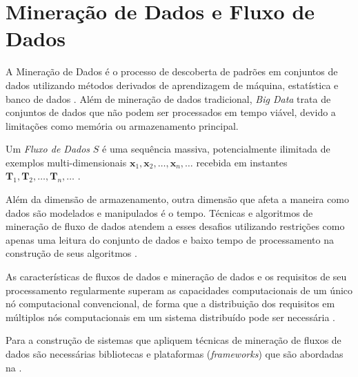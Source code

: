 \section{Mineração de Dados e Fluxo de Dados}

A Mineração de Dados é o processo de descoberta de padrões em conjuntos de dados
utilizando métodos derivados de aprendizagem de máquina, estatística e banco de
dados \cite{Gaber2005}.
Além de mineração de dados tradicional, \emph{Big Data} trata de
conjuntos de dados que não podem ser processados em tempo viável, devido a limitações
como memória ou armazenamento principal.

\begin{definition}
    Um \textit{Fluxo de Dados} $S$ é uma sequência massiva, potencialmente
    ilimitada de exemplos multi-dimensionais
    $\mathbf{x}_1, \mathbf{x}_2, \dots, \mathbf{x}_n, \dots$
    recebida em instantes
    $\mathbf{T}_1, \mathbf{T}_2, \dots, \mathbf{T}_n, \dots$
    \cite{Aggarwal2003}.
\end{definition}

Além da dimensão de armazenamento, outra dimensão que afeta a maneira como dados
são modelados e manipulados é o tempo.
Técnicas e algoritmos de mineração de fluxo de dados atendem a esses desafios utilizando
restrições como apenas uma leitura do conjunto de dados e baixo tempo de
processamento na construção de seus algoritmos \cite{Gama2007, Gaber2005}.

As características de fluxos de dados e mineração de dados e os requisitos de
seu processamento regularmente superam as capacidades computacionais de um único
nó computacional convencional, de forma que a distribuição dos requisitos em
múltiplos nós computacionais em um sistema distribuído pode ser necessária
\cite{Gaber2005}.


Para a construção de sistemas que apliquem técnicas de mineração de fluxos de
dados são necessárias bibliotecas e plataformas (\emph{frameworks})
que são abordadas na .

